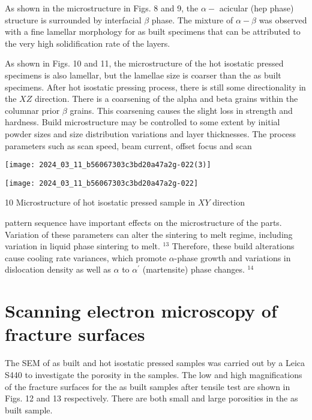\documentclass[10pt]{article}
\begin{document}
As shown in the microstructure in Figs. 8 and 9, the $\alpha-$ acicular (hep phase) structure is surrounded by interfacial $\beta$ phase. The mixture of $\alpha-\beta$ was observed with a fine lamellar morphology for as built specimens that can be attributed to the very high solidification rate of the layers.

As shown in Figs. 10 and 11, the microstructure of the hot isostatic pressed specimens is also lamellar, but the lamellae size is coarser than the as built specimens. After hot isostatic pressing process, there is still some directionality in the $X Z$ direction. There is a coarsening of the alpha and beta grains within the columnar prior $\beta$ grains. This coarsening causes the slight loss in strength and hardness. Build microstructure may be controlled to some extent by initial powder sizes and size distribution variations and layer thicknesses. The process parameters such as scan speed, beam current, offset focus and scan

\begin{center}
\texttt{[image: 2024\_03\_11\_b56067303c3bd20a47a2g-022(3)]}
\end{center}

\begin{center}
\texttt{[image: 2024\_03\_11\_b56067303c3bd20a47a2g-022]}
\end{center}

10 Microstructure of hot isostatic pressed sample in $X Y$ direction

pattern sequence have important effects on the microstructure of the parts. Variation of these parameters can alter the sintering to melt regime, including variation in liquid phase sintering to melt. ${ }^{13}$ Therefore, these build alterations cause cooling rate variances, which promote $\alpha$-phase growth and variations in dislocation density as well as $\alpha$ to $\alpha^{\prime}$ (martensite) phase changes. ${ }^{14}$

\section*{Scanning electron microscopy of fracture surfaces}
The SEM of as built and hot isostatic pressed samples was carried out by a Leica S440 to investigate the porosity in the samples. The low and high magnifications of the fracture surfaces for the as built samples after tensile test are shown in Figs. 12 and 13 respectively. There are both small and large porosities in the as built sample.
\end{document}
